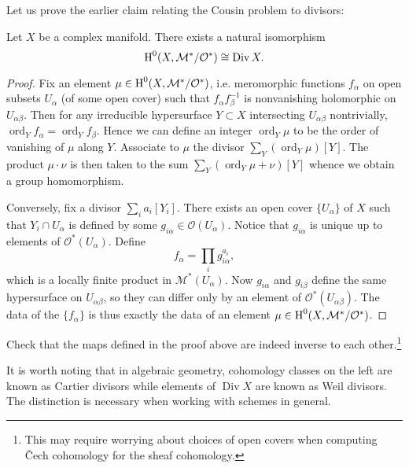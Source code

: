 \documentclass{amsart}
\DeclareMathOperator{\ord}{ord}
\DeclareMathOperator{\Div}{Div}
\begin{document}
Let us prove the earlier claim relating the Cousin problem to divisors:
\begin{proposition}
    Let $X$ be a complex manifold.
    There exists a natural isomorphism
    \begin{equation*}
        \HH^0(X, \mathcal{M}^*/\mathcal{O}^*) \cong \Div X.
    \end{equation*}
\end{proposition}
\begin{proof}
    Fix an element $\mu\in\operatorname{H}^0(X, \mathcal{M}^*/\mathcal{O}^*)$, i.e. meromorphic functions $f_\alpha$ on
    open subsets $U_\alpha$ (of some open cover) such that $f_\alpha f_\beta^{-1}$ is nonvanishing holomorphic
    on $U_{\alpha\beta}$. Then for any irreducible hypersurface $Y\subset X$ intersecting $U_{\alpha\beta}$
    nontrivially, $\ord_Y f_\alpha = \ord_Y f_\beta$. Hence we can define an integer $\ord_Y \mu$ to be the order
    of vanishing of $\mu$ along $Y$. Associate to $\mu$ the divisor $\sum_Y (\ord_Y \mu)[Y]$. 
    The product $\mu \cdot \nu$ is then taken to the sum $\sum_Y(\ord_Y \mu + \nu)[Y]$ whence we obtain
    a group homomorphism.

    Conversely, fix a divisor $\sum_i a_i[Y_i]$. There exists an open cover $\{U_\alpha\}$ of $X$ such that
    $Y_i\cap U_\alpha$ is defined by some $g_{i\alpha}\in\mathcal{O}(U_\alpha)$. Notice that $g_{i\alpha}$
    is unique up to elements of $\mathcal{O}^*(U_\alpha)$. Define
    \begin{equation*}
        f_\alpha = \prod_i g_{i\alpha}^{a_i},
    \end{equation*}
    which is a locally finite product in $\mathcal{M}^*(U_\alpha)$. Now $g_{i\alpha}$ and $g_{i\beta}$ define
    the same hypersurface on $U_{\alpha\beta}$, so they can differ only by an element of $\mathcal{O}^*(U_{\alpha\beta})$.
    The data of the $\{f_\alpha\}$ is thus exactly the data of an element $\mu\in\operatorname{H}^0(X, \mathcal{M}^*/\mathcal{O}^*)$.
\end{proof}

\begin{exercise}
    Check that the maps defined in the proof above are indeed inverse to each other.\footnote{This may require
    worrying about choices of open covers when computing \v Cech cohomology for the sheaf cohomology.}
\end{exercise}

It is worth noting that in algebraic geometry, cohomology classes on the left are known as {\color{blue}Cartier divisors}
while elements of $\Div X$ are known as {\color{blue}Weil divisors}. The distinction is necessary when working with
schemes in general.
\end{document}
